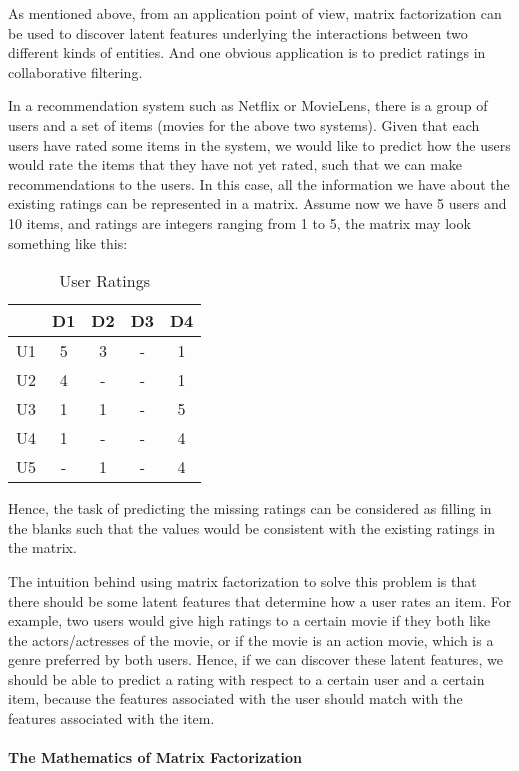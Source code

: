 As mentioned above, from an application point of view, matrix factorization can be used to discover latent features underlying the interactions between two different kinds of entities. And one obvious application is to predict ratings in collaborative filtering.

In a recommendation system such as Netflix or MovieLens, there is a group of users and a set of items (movies for the above two systems). Given that each users have rated some items in the system, we would like to predict how the users would rate the items that they have not yet rated, such that we can make recommendations to the users. In this case, all the information we have about the existing ratings can be represented in a matrix. Assume now we have 5 users and 10 items, and ratings are integers ranging from 1 to 5, the matrix may look something like this:
\begin{table}[ht]
\caption{User Ratings}
\centering %
\begin{tabular}{c c c c c}
\hline\hline %
& D1 & D2 & D3 & D4 \\ [0.5ex] %
\hline %
U1 & 5 & 3 & - & 1\\ %
U2 & 4 & - & - & 1\\
U3 & 1 & 1 & - & 5\\
U4 & 1 & - & - & 4\\
U5 & - & 1 & - & 4\\ [1ex] %
\hline %
\end{tabular}
\end{table}

Hence, the task of predicting the missing ratings can be considered as filling in the blanks such that the values would be consistent with the existing ratings in the matrix.
 
The intuition behind using matrix factorization to solve this problem is that there should be some latent features that determine how a user rates an item. For example, two users would give high ratings to a certain movie if they both like the actors/actresses of the movie, or if the movie is an action movie, which is a genre preferred by both users. Hence, if we can discover these latent features, we should be able to predict a rating with respect to a certain user and a certain item, because the features associated with the user should match with the features associated with the item.
\paragraph{The Mathematics of Matrix Factorization}

